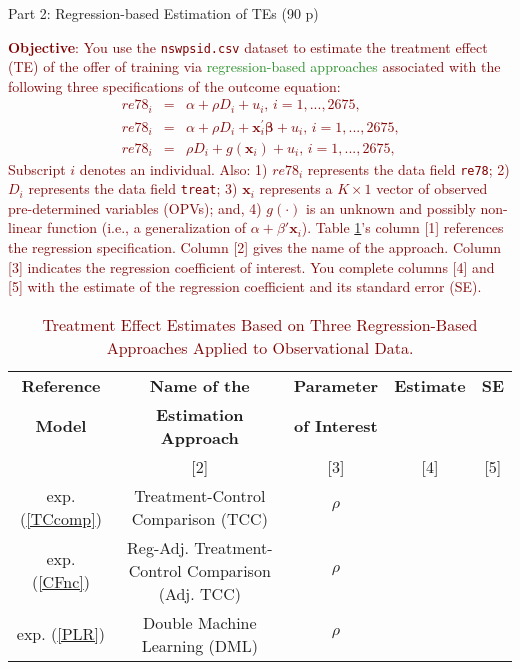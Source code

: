 
\begin{center}
{\LARGE Part 2: Regression-based Estimation of TEs (90 p)}
\end{center}

\noindent \textcolor{Maroon}{\textbf{Objective}: You use the \texttt{nswpsid.csv} dataset to estimate the treatment effect (TE) of the offer of training via \textcolor{ForestGreen}{regression-based approaches} associated with the following three specifications of the outcome equation:
\begin{eqnarray}
re78_{i} &=&\alpha +\rho D_{i}+u_{i}\text{, }i=1,...,2675\text{,}
\label{TCcomp} \\
re78_{i} &=&\alpha +\rho D_{i}+\mathbf{x}_{i}^{\prime }\mathbf{\beta }+u_{i}\text{, }i=1,...,2675\text{,}  \label{CFnc} \\
re78_{i} &=&\rho D_{i}+g(\mathbf{x}_{i})+u_{i}\text{, }i=1,...,2675\text{,}  \label{PLR} 
\end{eqnarray}
\noindent Subscript $i$ denotes an individual.  Also: 1) $re78_{i}$ represents the data field \texttt{re78}; 2) $D_{i}$ represents the data field \texttt{treat}; 3) $\mathbf{x}_{i}$ represents a $K\times 1$ vector of observed pre-determined variables (OPVs); and, 4) $g(\cdot)$ is an unknown and possibly non-linear function (i.e., a generalization of $\alpha + \beta' \mathbf{x}_{i}$). Table \ref{tab:reg-specs}'s column [1] references the regression specification. Column [2] gives the name of the approach. Column [3] indicates the regression coefficient of interest. You complete columns [4] and [5] with the estimate of the regression coefficient and its standard error (SE).}

\begin{table}[ht]
\centering
\colorbox{lightmaroon}{
{\color{Maroon}
\begin{tabular}{ccccc}
\hline
\textbf{Reference} & \multicolumn{1}{c}{\textbf{Name of the }} & \textbf{Parameter} & \multicolumn{1}{c}{\textbf{Estimate}} & \textbf{SE} \\
\textbf{Model} & \multicolumn{1}{c}{\textbf{Estimation Approach}}            & \textbf{of Interest} &  &  \\ \hline
[1] & [2] & [3] & [4] & [5]  \\ \hline
exp. (\ref{TCcomp})                 & Treatment-Control Comparison (TCC)                    & $\rho$             &   &   \\
exp. (\ref{CFnc})                 & Reg-Adj. Treatment-Control Comparison (Adj. TCC) & $\rho$             &  &  \\
exp. (\ref{PLR})                 & Double Machine Learning (DML) & $\rho$             &  &  \\
\hline
\end{tabular}}}
\caption{\textcolor{Maroon}{Treatment Effect Estimates Based on Three Regression-Based Approaches Applied to Observational Data.}}
\label{tab:reg-specs}
\end{table}

